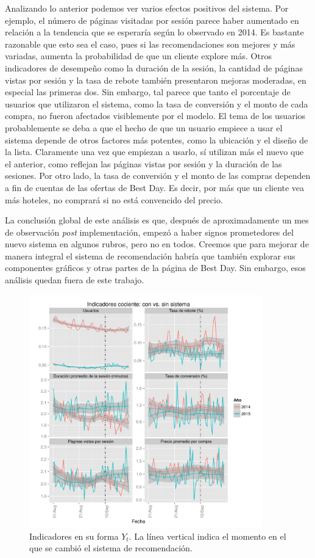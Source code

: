 \documentclass[12pt]{report}
\begin{document}
Analizando lo anterior podemos ver varios efectos positivos del sistema. Por ejemplo, el número de páginas visitadas por sesión parece haber aumentado en relación a la tendencia que se esperaría según lo observado en 2014. Es bastante razonable que esto sea el caso, pues si las recomendaciones son mejores y más variadas, aumenta la probabilidad de que un cliente explore más. Otros indicadores de desempeño como la duración de la sesión, la cantidad de páginas vistas por sesión y la tasa de rebote también presentaron mejoras moderadas, en especial las primeras dos. Sin embargo, tal parece que tanto el porcentaje de usuarios que utilizaron el sistema, como la tasa de conversión y el monto de cada compra, no fueron afectados visiblemente por el modelo. El tema de los usuarios probablemente se deba a que el hecho de que un usuario empiece a usar el sistema depende de otros factores más potentes, como la ubicación y el diseño de la lista. Claramente una vez que empiezan a usarlo, sí utilizan más el nuevo que el anterior, como reflejan las páginas vistas por sesión y la duración de las sesiones. Por otro lado, la tasa de conversión y el monto de las compras dependen a fin de cuentas de las ofertas de Best Day. Es decir, por más que un cliente vea más hoteles, no comprará si no está convencido del precio.

La conclusión global de este análisis es que, después de aproximadamente un mes de observación \emph{post} implementación, empezó a haber signos prometedores del nuevo sistema en algunos rubros, pero no en todos. Creemos que para mejorar de manera integral el sistema de recomendación habría que también explorar sus componentes gráficos y otras partes de la página de Best Day. Sin embargo, esos análisis quedan fuera de este trabajo.

\begin{figure}[ht]
	\centering
	\includegraphics[width=0.9\textwidth]{imagenes/analytics_anios_y.pdf}
	\caption{\label{fig:analytics_y} Indicadores en su forma $Y_t$. La línea vertical indica el momento en el que se cambió el sistema de recomendación.}
\end{figure}
\end{document}
